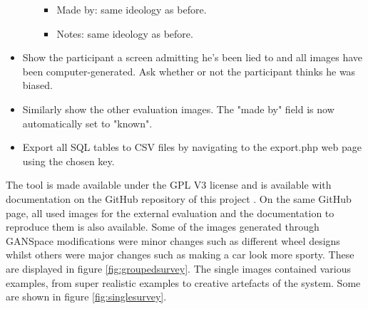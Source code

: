 \begin{itemize}
\begin{itemize}
\begin{itemize}
            \item Made by: same ideology as before.
            \item Notes: same ideology as before.
        \end{itemize}
    \end{itemize}
    \item Show the participant a screen admitting he's been lied to and all images have been computer-generated. Ask whether or not the participant thinks he was biased.
    \item Similarly show the other evaluation images. The "made by" field is now automatically set to "known".
    \item Export all SQL tables to CSV files by navigating to the export.php web page using the chosen key.
\end{itemize}

The tool is made available under the GPL V3 license and is available with documentation on the GitHub repository of this project \citep{github_project}.
On the same GitHub page, all used images for the external evaluation and the documentation to reproduce them is also available.
Some of the images generated through GANSpace modifications were minor changes such as different wheel designs whilst others were major changes such as making a car look more sporty.
These are displayed in figure \ref{fig:groupedsurvey}.
The single images contained various examples, from super realistic examples to creative artefacts of the system.
Some are shown in figure \ref{fig:singlesurvey}.


